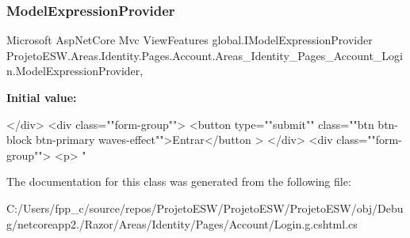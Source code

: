 \subsubsection{\texorpdfstring{Model\+Expression\+Provider}{ModelExpressionProvider}}
{\footnotesize\ttfamily Microsoft Asp\+Net\+Core Mvc View\+Features global.\+I\+Model\+Expression\+Provider Projeto\+E\+S\+W.\+Areas.\+Identity.\+Pages.\+Account.\+Areas\+\_\+\+Identity\+\_\+\+Pages\+\_\+\+Account\+\_\+\+Login.\+Model\+Expression\+Provider\hspace{0.3cm}{\ttfamily [get]}, {}}

{\bfseries Initial value\+:}
\begin{DoxyCode}

                </div>
                <div \textcolor{keyword}{class}=\textcolor{stringliteral}{""}form-group\textcolor{stringliteral}{""}>
                    <button type=\textcolor{stringliteral}{""}submit\textcolor{stringliteral}{""} \textcolor{keyword}{class}=\textcolor{stringliteral}{""}btn btn-block btn-primary waves-effect\textcolor{stringliteral}{""}>Entrar</button
      >
                </div>
                <div \textcolor{keyword}{class}=\textcolor{stringliteral}{""}form-group\textcolor{stringliteral}{""}>
                    <p>
                        \textcolor{stringliteral}{"}
\end{DoxyCode}


The documentation for this class was generated from the following file\+:\begin{DoxyCompactItemize}
\item 
C\+:/\+Users/fpp\+\_\+c/source/repos/\+Projeto\+E\+S\+W/\+Projeto\+E\+S\+W/\+Projeto\+E\+S\+W/obj/\+Debug/netcoreapp2./\+Razor/\+Areas/\+Identity/\+Pages/\+Account/Login.\+g.\+cshtml.\+cs\end{DoxyCompactItemize}
